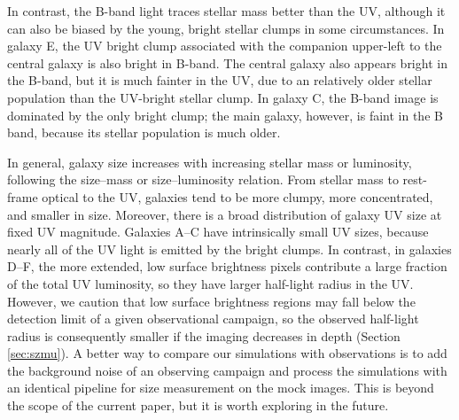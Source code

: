 \documentclass[useAMS,usenatbib]{mn2e}
\begin{document}
In contrast, the B-band light traces stellar mass better than the UV, although it can also be biased by the young, bright stellar clumps in some circumstances. In galaxy E, the UV bright clump associated with the companion upper-left to the central galaxy is also bright in B-band. The central galaxy also appears bright in the B-band, but it is much fainter in the UV, due to an relatively older stellar population than the UV-bright stellar clump. In galaxy C, the B-band image is dominated by the only bright clump; the main galaxy, however, is faint in the B band, because its stellar population is much older.

In general, galaxy size increases with increasing stellar mass or luminosity, following the size--mass or size--luminosity relation. From stellar mass to rest-frame optical to the UV, galaxies tend to be more clumpy, more concentrated, and smaller in size. Moreover, there is a broad distribution of galaxy UV size at fixed UV magnitude. Galaxies A--C have intrinsically small UV sizes, because nearly all of the UV light is emitted by the bright clumps. In contrast, in galaxies D--F, the more extended, low surface brightness pixels contribute a large fraction of the total UV luminosity, so they have larger half-light radius in the UV. However, we caution that low surface brightness regions may fall below the detection limit of a given observational campaign, so the observed half-light radius is consequently smaller if the imaging decreases in depth (Section \ref{sec:szmu}). A better way to compare our simulations with observations is to add the background noise of an observing campaign and process the simulations with an identical pipeline for size measurement on the mock images. This is beyond the scope of the current paper, but it is worth exploring in the future.
\end{document}
